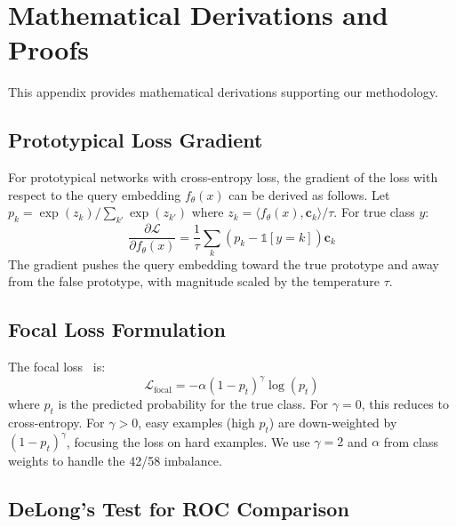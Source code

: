 \chapter{Mathematical Derivations and Proofs}
\label{app:math_derivations}

This appendix provides mathematical derivations supporting our methodology.

\section{Prototypical Loss Gradient}

For prototypical networks with cross-entropy loss, the gradient of the loss with respect to the query embedding $f_\theta(x)$ can be derived as follows. Let $p_k = \exp(z_k) / \sum_{k'} \exp(z_{k'})$ where $z_k = \langle f_\theta(x), \mathbf{c}_k \rangle / \tau$. For true class $y$:
\begin{equation}
\frac{\partial \mathcal{L}}{\partial f_\theta(x)} = \frac{1}{\tau} \sum_k (p_k - \mathbb{1}[y=k]) \mathbf{c}_k
\end{equation}
The gradient pushes the query embedding toward the true prototype and away from the false prototype, with magnitude scaled by the temperature $\tau$.

\section{Focal Loss Formulation}

The focal loss~\cite{lin2017focal} is:
\begin{equation}
\mathcal{L}_{\text{focal}} = -\alpha (1-p_t)^\gamma \log(p_t)
\end{equation}
where $p_t$ is the predicted probability for the true class. For $\gamma = 0$, this reduces to cross-entropy. For $\gamma > 0$, easy examples (high $p_t$) are down-weighted by $(1-p_t)^\gamma$, focusing the loss on hard examples. We use $\gamma = 2$ and $\alpha$ from class weights to handle the 42/58 imbalance.

\section{DeLong's Test for ROC Comparison}


